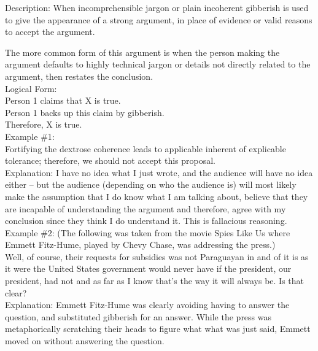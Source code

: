 \documentclass[a4paper,12pt,single,pdftex]{scrartcl}
\begin{document}
  
    Description: When incomprehensible jargon or plain incoherent gibberish is used to give the appearance of a strong argument, in place of evidence or valid reasons to accept the argument.

    
      The more common form of this argument is when the person making the argument defaults to highly technical jargon or details not directly related to the argument, then restates the conclusion.
    \\

    
      Logical Form:
    \\

    
      Person 1 claims that X is true.
    \\

    
      Person 1 backs up this claim by gibberish.
    \\

    
      Therefore, X is true.
    \\

    
      Example \#1:
    \\

    
      Fortifying the dextrose coherence leads to applicable inherent of explicable tolerance; therefore, we should not accept this proposal.
    \\

    
      Explanation: I have no idea what I just wrote, and the audience will have no idea either -- but the audience (depending on who the audience is) will most likely make the assumption that I do know what I am talking about, believe that they are incapable of understanding the argument and therefore, agree with my conclusion since they think I do understand it.  This is fallacious reasoning.
    \\

    
      Example \#2: (The following was taken from the movie Spies Like Us where Emmett Fitz-Hume, played by Chevy Chase, was addressing the press.)
    \\

    
      Well, of course, their requests for subsidies was not Paraguayan in and of it is as it were the United States government would never have if the president, our president, had not and as far as I know that's the way it will always be. Is that clear?
    \\

    
      Explanation: Emmett Fitz-Hume was clearly avoiding having to answer the question, and substituted gibberish for an answer. While the press was metaphorically scratching their heads to figure what what was just said, Emmett moved on without answering the question.
    \\
\end{document}
